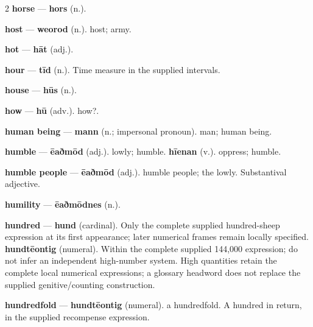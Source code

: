 \begin{multicols}{2}
\textbf{horse} — \textbf{hors} (n.).\par
\textbf{host} — \textbf{weorod} (n.). host; army.\par
\textbf{hot} — \textbf{hāt} (adj.).\par
\textbf{hour} — \textbf{tīd} (n.). Time measure in the supplied intervals.\par
\textbf{house} — \textbf{hūs} (n.).\par
\textbf{how} — \textbf{hū} (adv.). how?.\par
\textbf{human being} — \textbf{mann} (n.; impersonal pronoun). man; human being.\par
\textbf{humble} — \textbf{ēaðmōd} (adj.). lowly; humble. \textbf{hīenan} (v.). oppress; humble.\par
\textbf{humble people} — \textbf{ēaðmōd} (adj.). humble people; the lowly. Substantival adjective.\par
\textbf{humility} — \textbf{ēaðmōdnes} (n.).\par
\textbf{hundred} — \textbf{hund} (cardinal). Only the complete supplied hundred-sheep expression at its first appearance; later numerical frames remain locally specified. \textbf{hundtēontig} (numeral). Within the complete supplied 144,000 expression; do not infer an independent high-number system. High quantities retain the complete local numerical expressions; a glossary headword does not replace the supplied genitive/counting construction.\par
\textbf{hundredfold} — \textbf{hundtēontig} (numeral). a hundredfold. A hundred in return, in the supplied recompense expression.\par

\end{multicols}
